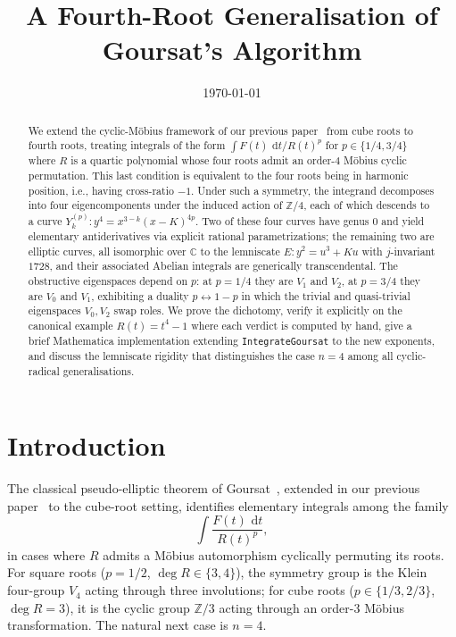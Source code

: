 \documentclass[11pt,a4paper]{article}
\title{\textbf{A Fourth-Root Generalisation of Goursat's Algorithm}}
\author{}
\date{\today}
\theoremstyle{plain}
\theoremstyle{definition}
\theoremstyle{remark}
\newcommand{\C}{\mathbb{C}}
\newcommand{\Z}{\mathbb{Z}}
\renewcommand{\d}{\,\mathrm{d}}
\begin{document}
\maketitle

\begin{abstract}
We extend the cyclic-Möbius framework of our previous paper~\cite{GoursatCubic} from cube roots to fourth roots, treating integrals of the form $\int F(t)\,\d t / R(t)^p$ for $p \in \{1/4, 3/4\}$ where $R$ is a quartic polynomial whose four roots admit an order-$4$ Möbius cyclic permutation. This last condition is equivalent to the four roots being in harmonic position, i.e., having cross-ratio $-1$. Under such a symmetry, the integrand decomposes into four eigencomponents under the induced action of $\Z/4$, each of which descends to a curve $Y_k^{(p)}\colon y^4 = x^{3-k}(x-K)^{4p}$. Two of these four curves have genus $0$ and yield elementary antiderivatives via explicit rational parametrizations; the remaining two are elliptic curves, all isomorphic over $\C$ to the lemniscate $E\colon y^2 = u^3 + Ku$ with $j$-invariant $1728$, and their associated Abelian integrals are generically transcendental. The obstructive eigenspaces depend on $p$: at $p = 1/4$ they are $V_1$ and $V_2$, at $p = 3/4$ they are $V_0$ and $V_1$, exhibiting a duality $p \leftrightarrow 1 - p$ in which the trivial and quasi-trivial eigenspaces $V_0, V_2$ swap roles. We prove the dichotomy, verify it explicitly on the canonical example $R(t) = t^4 - 1$ where each verdict is computed by hand, give a brief Mathematica implementation extending \texttt{IntegrateGoursat} to the new exponents, and discuss the lemniscate rigidity that distinguishes the case $n=4$ among all cyclic-radical generalisations.
\end{abstract}

\section{Introduction}

The classical pseudo-elliptic theorem of Goursat~\cite{Goursat1887}, extended in our previous paper~\cite{GoursatCubic} to the cube-root setting, identifies elementary integrals among the family
\[
  \int \frac{F(t)\,\d t}{R(t)^p},
\]
in cases where $R$ admits a Möbius automorphism cyclically permuting its roots. For square roots ($p = 1/2$, $\deg R \in \{3, 4\}$), the symmetry group is the Klein four-group $V_4$ acting through three involutions; for cube roots ($p \in \{1/3, 2/3\}$, $\deg R = 3$), it is the cyclic group $\Z/3$ acting through an order-$3$ Möbius transformation. The natural next case is $n = 4$.
\end{document}
